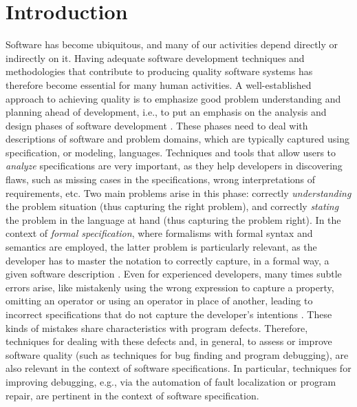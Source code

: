 \section{Introduction}

Software has become ubiquitous, and many of our activities depend directly or indirectly on it. Having adequate software development techniques and methodologies that contribute to producing quality software systems has therefore become essential for many human activities. A well-established approach to achieving quality is to emphasize good problem understanding and planning ahead of development, i.e., to put an emphasis on the analysis and design phases of software development \cite{Ghezzi+2002}. These phases need to deal with descriptions of software and problem domains, which are typically captured using specification, or modeling, languages. Techniques and tools that allow users to \emph{analyze} specifications are very important, as they help developers in discovering flaws, such as missing cases in the specifications, wrong interpretations of requirements, etc. Two main problems arise in this phase: correctly \emph{understanding} the problem situation (thus capturing the right problem), and correctly \emph{stating} the problem in the language at hand (thus capturing the problem right). In the context of \emph{formal specification}, where formalisms with formal syntax and semantics are employed, the latter problem is particularly relevant, as the developer has to master the notation to correctly capture, in a formal way, a given software description \cite{ClarkeWing1996}. Even for experienced developers, many times subtle errors arise, like mistakenly using the wrong expression to capture a property, omitting an operator or using an operator in place of another, leading to incorrect specifications that do not capture the developer's intentions \cite{Nelson+2017}. These kinds of mistakes share characteristics with program defects. Therefore, techniques for dealing with these defects and, in general, to assess or improve software quality (such as techniques for bug finding and program debugging), are also relevant in the context of software specifications. In particular, techniques for improving debugging, e.g., via the automation of fault localization or program repair, are pertinent in the context of software specification. 

